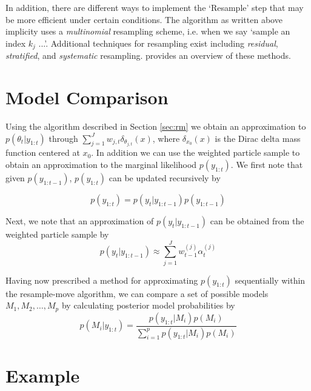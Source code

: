 \documentclass{article}
\begin{document}
In addition, there are different ways to implement the `Resample' step that may be more efficient under certain conditions. The algorithm as written above implicity uses a \emph{multinomial} resampling scheme, i.e. when we say `sample an index $k_j$ ...'. Additional techniques for resampling exist including \emph{residual}, \emph{stratified}, and \emph{systematic} resampling. \citet{Douc:Capp:Moul:comp:2005} provides an overview of these methods. %

\section{Model Comparison}

Using the algorithm described in Section \ref{sec:rm} we obtain an approximation to $p(\theta_t|y_{1:t})$ through $\sum_{j=1}^J w_{j,t}\delta_{\theta_{j,t}}(x)$, where $\delta_{x_0}(x)$ is the Dirac delta mass function centered at $x_0$. In addition we can use the weighted particle sample to obtain an approximation to the marginal likelihood $p(y_{1:t})$. We first note that given $p(y_{1:t-1})$, $p(y_{1:t})$ can be updated recursively by

\begin{equation}
p(y_{1:t}) = p(y_t|y_{1:t-1})p(y_{1:t-1}) \label{eqn:marglik}
\end{equation}

\noindent Next, we note that an approximation of $p(y_t|y_{1:t-1})$ can be obtained from the weighted particle sample by
\begin{equation}
p(y_t|y_{1:t-1}) \approx \sum_{j=1}^J w^{(j)}_{t-1}\alpha^{(j)}_t \label{eqn:condmarg}
\end{equation}

Having now prescribed a method for approximating $p(y_{1:t})$ sequentially within the resample-move algorithm, we can compare a set of possible models ${M_1,M_2,\ldots,M_p}$ by calculating posterior model probabilities by
\begin{equation}
p(M_i|y_{1:t}) = \frac{p(y_{1:t}|M_i)p(M_i)}{\sum_{i=1}^p p(y_{1:t}|M_i)p(M_i)} \label{eqn:modelcomp}
\end{equation}

\section{Example}
\end{document}
